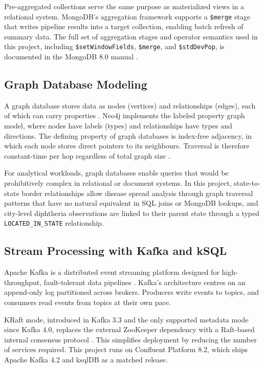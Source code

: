 \documentclass[12pt,a4paper]{article}
\begin{document}
Pre-aggregated collections serve the same purpose as materialized views in a relational system. MongoDB's aggregation framework supports a \texttt{\$merge} stage that writes pipeline results into a target collection, enabling batch refresh of summary data. The full set of aggregation stages and operator semantics used in this project, including \texttt{\$setWindowFields}, \texttt{\$merge}, and \texttt{\$stdDevPop}, is documented in the MongoDB 8.0 manual \cite{mongodocs}.

\subsection{Graph Database Modeling}

A graph database stores data as nodes (vertices) and relationships (edges), each of which can carry properties \cite{robinson2015}. Neo4j implements the labeled property graph model, where nodes have labels (types) and relationships have types and directions. The defining property of graph databases is index-free adjacency, in which each node stores direct pointers to its neighbours. Traversal is therefore constant-time per hop regardless of total graph size \cite{angles2008}.

For analytical workloads, graph databases enable queries that would be prohibitively complex in relational or document systems. In this project, state-to-state border relationships allow disease spread analysis through graph traversal patterns that have no natural equivalent in SQL joins or MongoDB lookups, and city-level diphtheria observations are linked to their parent state through a typed \texttt{LOCATED\_IN\_STATE} relationship.

\subsection{Stream Processing with Kafka and kSQL}

Apache Kafka is a distributed event streaming platform designed for high-throughput, fault-tolerant data pipelines \cite{kreps2011}. Kafka's architecture centres on an append-only log partitioned across brokers. Producers write events to topics, and consumers read events from topics at their own pace.

KRaft mode, introduced in Kafka 3.3 and the only supported metadata mode since Kafka 4.0, replaces the external ZooKeeper dependency with a Raft-based internal consensus protocol \cite{kafkadocs}. This simplifies deployment by reducing the number of services required. This project runs on Confluent Platform 8.2, which ships Apache Kafka 4.2 and ksqlDB as a matched release.
\end{document}
